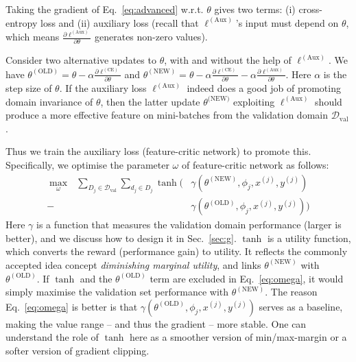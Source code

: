 \documentclass{article}
\begin{document}
Taking the gradient of Eq.~\ref{eq:advanced} w.r.t. $\theta$ gives two terms: (i) cross-entropy loss and (ii) auxiliary loss (recall that $\ell^{(\text{Aux})}$'s input must depend on $\theta$, which means $\frac{\partial \ell^{(\text{Aux})}}{\partial \theta}$  generates non-zero values). 

Consider two alternative updates to $\theta$, with and without the help of $\ell^{(\text{Aux})}$. We have $\theta^{(\text{OLD})}=\theta - \alpha \frac{\partial \ell^{(\text{CE})}}{\partial \theta}$ and $\theta^{(\text{NEW})}=\theta - \alpha \frac{\partial \ell^{(\text{CE})}}{\partial \theta} - \alpha \frac{\partial \ell^{(\text{Aux})}}{\partial \theta}$. Here $\alpha$ is the step size of $\theta$. If the auxiliary loss $\ell^{(\text{Aux})}$ indeed does a good job of promoting domain invariance of $\theta$, then the latter update $\theta^{\text{(NEW)}}$ exploiting $\ell^{(\text{Aux})}$ should produce a more effective feature on mini-batches from the validation domain $\mathcal{D}_\text{val}$.

Thus we train the auxiliary loss (feature-critic network) to promote this. Specifically, we optimise the parameter $\omega$ of feature-critic network as follows: 
\begin{equation}\label{eq:omega}
\begin{split}
\underset{\omega}{\operatorname{max}}~~~  \sum_{D_j\in \mathcal{D}_\text{val}}\sum_{d_j\in D_j}\tanh(&\gamma(\theta^{(\text{NEW})}, \phi_j, x^{(j)}, y^{(j)})\\
-&\gamma(\theta^{(\text{OLD})}, \phi_j, x^{(j)}, y^{(j)}))    
\end{split}
\end{equation}
\noindent Here $\gamma$ is a function that measures the validation domain performance (larger is better), and we discuss how to design it in Sec.~\ref{sec:g}. $\tanh$ is a utility function, which converts the reward (performance gain) to utility. It reflects the commonly accepted idea concept \emph{diminishing marginal utility}, and links   $\theta^{(\text{NEW})}$ with $\theta^{(\text{OLD})}$. If $\tanh$ and the $\theta^{(\text{OLD})}$ term are excluded in  Eq.~\ref{eq:omega}, it would simply maximise the  validation set performance with $\theta^{(\text{NEW})}$. The reason Eq.~\ref{eq:omega} is better is that  $\gamma(\theta^{(\text{OLD})}, \phi_j, x^{(j)}, y^{(j)})$ serves as a baseline, making the value range -- and thus the gradient -- more stable. One can understand the role of  $\tanh$ here as a smoother version of min/max-margin or a softer version of gradient clipping.
\end{document}
